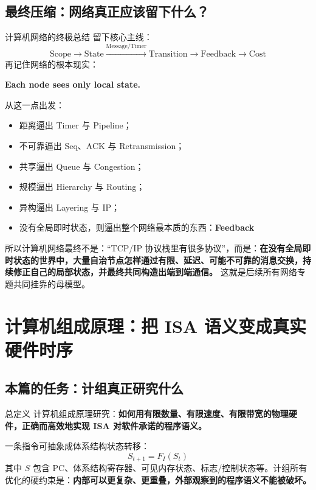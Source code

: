 \documentclass[11pt,a4paper,openany]{ctexbook}
\newcommand{\key}[1]{\textbf{\color{deep}#1}}
\begin{document}
\section{最终压缩：网络真正应该留下什么？}
\begin{corebox}{计算机网络的终极总结}
留下核心主线：
\[
\text{Scope} \rightarrow \text{State} \xrightarrow{\text{Message/Timer}} \text{Transition} \rightarrow \text{Feedback} \rightarrow \text{Cost}
\]
再记住网络的根本现实：
\begin{center}
\textbf{Each node sees only local state.}
\end{center}

从这一点出发：
\begin{itemize}
    \item 距离逼出 Timer 与 Pipeline；
    \item 不可靠逼出 Seq、ACK 与 Retransmission；
    \item 共享逼出 Queue 与 Congestion；
    \item 规模逼出 Hierarchy 与 Routing；
    \item 异构逼出 Layering 与 IP；
    \item 没有全局即时状态，则逼出整个网络最本质的东西：\key{Feedback}
\end{itemize}

所以计算机网络最终不是：“TCP/IP 协议栈里有很多协议”，而是：\textbf{在没有全局即时状态的世界中，大量自治节点怎样通过有限、延迟、可能不可靠的消息交换，持续修正自己的局部状态，并最终共同构造出端到端通信。}
这就是后续所有网络专题共同挂靠的母模型。
\end{corebox}
\chapter{计算机组成原理：把 ISA 语义变成真实硬件时序}

\section{本篇的任务：计组真正研究什么}
\begin{corebox}{总定义}
计算机组成原理研究：\textbf{如何用有限数量、有限速度、有限带宽的物理硬件，正确而高效地实现 ISA 对软件承诺的程序语义。}
\end{corebox}

一条指令可抽象成体系结构状态转移：
\[
\boxed{S_{t+1}=F_I(S_t)}
\]
其中 $S$ 包含 PC、体系结构寄存器、可见内存状态、标志/控制状态等。计组所有优化的硬约束是：\textbf{内部可以更复杂、更重叠，外部观察到的程序语义不能被破坏。}
\end{document}
